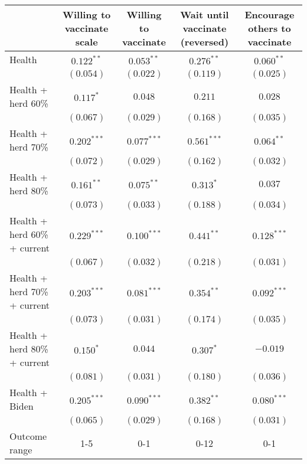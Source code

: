 \begin{table}
\begin{center}
\begin{tabular}{l c c c c}
\hline
 & Willing to vaccinate scale & Willing to vaccinate & Wait until vaccinate (reversed) & Encourage others to vaccinate \\
\hline
Health                       & $0.122^{**}$  & $0.053^{**}$  & $0.276^{**}$  & $0.060^{**}$  \\
                             & $(0.054)$     & $(0.022)$     & $(0.119)$     & $(0.025)$     \\
Health + herd 60\%           & $0.117^{*}$   & $0.048$       & $0.211$       & $0.028$       \\
                             & $(0.067)$     & $(0.029)$     & $(0.168)$     & $(0.035)$     \\
Health + herd 70\%           & $0.202^{***}$ & $0.077^{***}$ & $0.561^{***}$ & $0.064^{**}$  \\
                             & $(0.072)$     & $(0.029)$     & $(0.162)$     & $(0.032)$     \\
Health + herd 80\%           & $0.161^{**}$  & $0.075^{**}$  & $0.313^{*}$   & $0.037$       \\
                             & $(0.073)$     & $(0.033)$     & $(0.188)$     & $(0.034)$     \\
Health + herd 60\% + current & $0.229^{***}$ & $0.100^{***}$ & $0.441^{**}$  & $0.128^{***}$ \\
                             & $(0.067)$     & $(0.032)$     & $(0.218)$     & $(0.031)$     \\
Health + herd 70\% + current & $0.203^{***}$ & $0.081^{***}$ & $0.354^{**}$  & $0.092^{***}$ \\
                             & $(0.073)$     & $(0.031)$     & $(0.174)$     & $(0.035)$     \\
Health + herd 80\% + current & $0.150^{*}$   & $0.044$       & $0.307^{*}$   & $-0.019$      \\
                             & $(0.081)$     & $(0.031)$     & $(0.180)$     & $(0.036)$     \\
Health + Biden               & $0.205^{***}$ & $0.090^{***}$ & $0.382^{**}$  & $0.080^{***}$ \\
                             & $(0.065)$     & $(0.029)$     & $(0.168)$     & $(0.031)$     \\
\hline
Outcome range                & 1-5           & 0-1           & 0-12          & 0-1           \\

\end{tabular}
\end{center}
\end{table}
